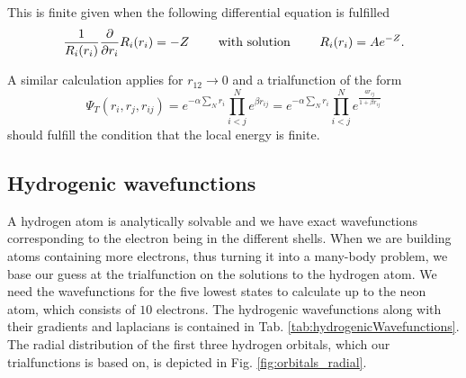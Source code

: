 		This is finite given when the following differential equation is fulfilled
		\begin{align}
			\frac{1}{R_i(r_i)} \pdv{}{r_i} R_i(r_i)	=  -Z  \qquad{ \text{ with solution }}  \qquad R_i(r_i) = A e^{-Z}.
		\end{align}

		A similar calculation applies for \(r_{12} \rightarrow 0\) and a trialfunction of the form   \[\Psi_T(r_i,r_j,r_{ij}) = e^{ -\alpha \sum_{N}  r_i} \prod^N_{i < j}e^{\beta r_{ij}} = e^{ -\alpha \sum_{N}  r_i} \prod^N_{i < j}e^{\frac{a r_{ij}}{1 + \beta r_{ij}}} \] should fulfill the condition that the local energy is finite.
	
	\subsection{Hydrogenic wavefunctions} \label{sec:hydrogenic_wavefunctions}
		A hydrogen atom is analytically solvable and we have exact wavefunctions corresponding to the electron being in the different shells. When we are building atoms containing more electrons, thus turning it into a many-body problem, we base our guess at the trialfunction on the solutions to the hydrogen atom. We need the wavefunctions for the five lowest states to calculate up to the neon atom, which consists of $10$ electrons. The hydrogenic wavefunctions along with their gradients and laplacians is contained in Tab. \ref{tab:hydrogenicWavefunctions}. The radial distribution of the first three hydrogen orbitals, which our trialfunctions is based on, is depicted in Fig. \ref{fig:orbitals_radial}.



